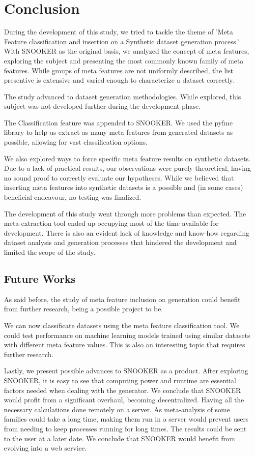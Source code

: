 \chapter{Conclusion}
\label{chap:Conclusion}

During the development of this study, we tried to tackle the theme of 'Meta Feature classification and insertion on a Synthetic dataset generation process.' With SNOOKER as the original basis, we analyzed the concept of meta features, exploring the subject and presenting the most commonly known family of meta features. While groups of meta features are not uniformly described, the list presentive is extensive and varied enough to characterize a dataset correctly.

The study advanced to dataset generation methodologies. While explored, this subject was not developed further during the development phase.

The Classification feature was appended to SNOOKER. We used the pyfme library to help us extract as many meta features from generated datasets as possible, allowing for vast classification options.

We also explored ways to force specific meta feature results on synthetic datasets. Due to a lack of practical results, our observations were purely theoretical, having no sound proof to correctly evaluate our hypotheses. While we believed that inserting meta features into synthetic datasets is a possible and (in some cases) beneficial endeavour, no testing was finalized.

The development of this study went through more problems than expected. The meta-extraction tool ended up occupying most of the time available for development. There is also an evident lack of knowledge and know-how regarding dataset analysis and generation processes that hindered the development and limited the scope of the study. 

\section{Future Works}
As said before, the study of meta feature inclusion on generation could benefit from further research, being a possible project to be.

We can now classificate datasets using the meta feature classification tool. We could test performance on machine learning models trained using similar datasets with different meta feature values. This is also an interesting topic that requires further research.

Lastly, we present possible advances to SNOOKER as a product. After exploring SNOOKER, it is easy to see that computing power and runtime are essential factors needed when dealing with the generator. We conclude that SNOOKER would profit from a significant overhaul, becoming decentralized. Having all the necessary calculations done remotely on a server. As meta-analysis of some families could take a long time, making them run in a server would prevent users from needing to keep processes running for long times. The results could be sent to the user at a later date. We conclude that SNOOKER would benefit from evolving into a web service.
